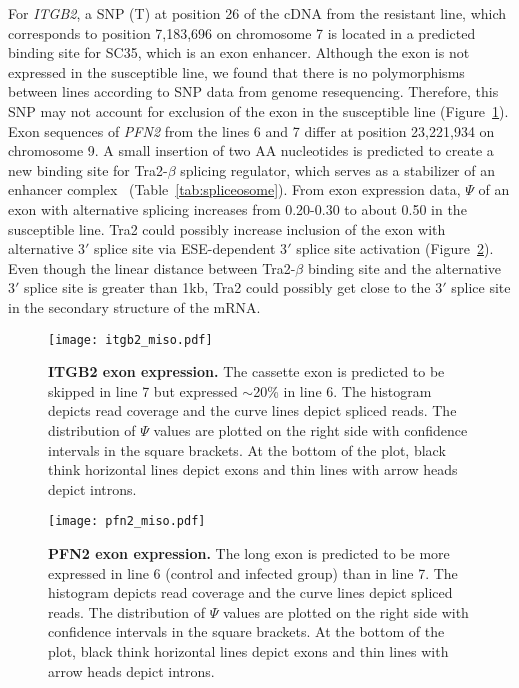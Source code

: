 For {\em ITGB2}, a SNP (T) at position 26 of the cDNA from the
resistant line, which corresponds to position 7,183,696 on
chromosome 7 is located in a predicted binding site for SC35,
which is an exon enhancer.  Although the exon is not expressed in
the susceptible line, we found that there is no polymorphisms
between lines according to SNP data from genome resequencing.
Therefore, this SNP may not account for exclusion of the exon in
the susceptible line (Figure~\ref{itgb2}).  Exon sequences of
{\em PFN2} from the lines 6 and 7 differ at position 23,221,934
on chromosome 9.  A small insertion of two AA nucleotides is
predicted to create a new binding site for Tra2-$\beta$ splicing
regulator, which serves as a stabilizer of an enhancer
complex~\cite{lopez1998alternative}
(Table~\ref{tab:spliceosome}).  From exon expression data, $\Psi$
of an exon with alternative splicing increases from 0.20-0.30 to
about 0.50 in the susceptible line.  Tra2 could possibly increase
inclusion of the exon with alternative 3$\prime$ splice site via
ESE-dependent 3$\prime$ splice site activation
(Figure~\ref{pfn2}).  Even though the linear distance between
Tra2-$\beta$ binding site and the alternative 3$\prime$ splice
site is greater than 1kb, Tra2 could possibly get close to the
3$\prime$ splice site in the secondary structure of the mRNA.

\clearpage\pagestyle{lscape}
\begin{landscape}
\begin{figure}[!ht]
    \begin{center}
        \texttt{[image: itgb2\_miso.pdf]}
    \end{center}
    \caption{
        \textbf{ITGB2 exon expression.}
        The cassette exon is predicted to be skipped in line 7
        but expressed $\sim$20\% in line 6. The histogram depicts
        read coverage and the curve lines depict spliced reads. The
        distribution of $\Psi$ values are plotted on the right
        side with confidence intervals in the square brackets. At
        the bottom of the plot, black think horizontal lines
        depict exons and thin lines with arrow heads depict
        introns.
    }
    \label{itgb2}
\end{figure}
\begin{figure}[!ht]
    \begin{center}
        \texttt{[image: pfn2\_miso.pdf]}
    \end{center}
    \caption{
        \textbf{PFN2 exon expression.}
        The long exon is predicted to be more expressed in line 6
        (control and infected group) than in line 7. The
        histogram depicts read coverage and the curve lines
        depict spliced reads. The distribution of $\Psi$ values
        are plotted on the right side with confidence intervals
        in the square brackets.  At the bottom of the plot, black
        think horizontal lines depict exons and thin lines with
        arrow heads depict introns.
    }
    \label{pfn2}
\end{figure}
\end{landscape}
\pagestyle{plain}


